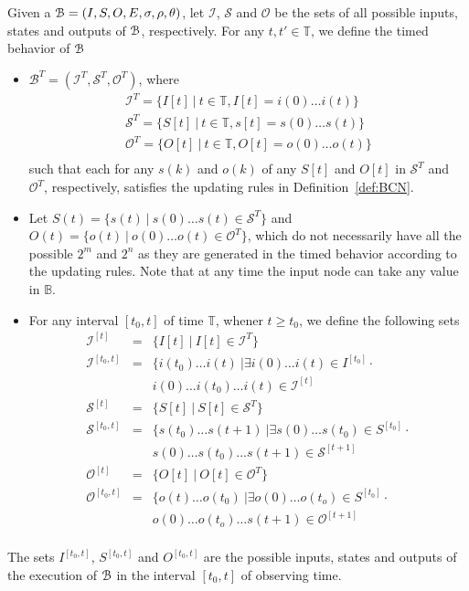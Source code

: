 Given a {\BCN} ${\mathcal{B}} = (I,S,O, E, \sigma, \rho,\theta)$, let $\mathcal{I}$, $\mathcal{S}$ and $\mathcal{O}$ be the sets of all possible inputs, states and outputs of ${\mathcal{B}}$, respectively. For any $t,t' \in \mathbb{T}$, we define the timed behavior of ${\mathcal{B}}$
\begin{itemize}
\item $\mathcal{B}^T = (\mathcal{I}^T, \mathcal{S}^T, \mathcal{O}^T)$,  where 
{\small \[\begin{array}{llll}
\mathcal{I}^T =\{I[t]~|~ t\in \mathbb{T}, I[t]=i(0)\ldots i(t)\}\\
\mathcal{S}^T =\{S[t]~|~ t\in \mathbb{T}, s[t]=s(0)\ldots s(t)\}\\
\mathcal{O}^T =\{O[t]~|~ t\in \mathbb{T}, O[t]=o(0)\ldots o(t)\}\\
\end{array}
\]}
such that each for any $s(k)$ and $o(k)$ of any $S[t]$ and 
$O[t]$ in $\mathcal{S}^T$ and $\mathcal{O}^T$, respectively,   satisfies the updating rules in Definition~\ref{def:BCN}.
\item Let $S(t) = \{ s(t)~|~ s(0)\ldots s(t) \in \mathcal{S}^T\}$ and $O(t) = \{ o(t)~|~ o(0)\ldots o(t) \in \mathcal{O}^T\}$, which do not necessarily have all the possible $2^m$ and $2^n$ as they are generated in the timed behavior according to the updating rules. Note that at any time the input node can take any value in $\mathbb{B}$.
\item For any interval  $[t_0,t]$ of time $\mathbb{T}$, whener $t\geq t_0$, we define the following sets 
\[\begin{array}{llllll}
\mathcal{I}^{[t]} &=& \{I[t] ~|~ I[t]\in \mathcal{I}^T\}\\
\mathcal{I}^{[t_0,t]} &=& \{i(t_0)\ldots i(t)~|\exists i(0)\ldots i(t)\in I^{[t_0]}\cdot\\
&& i(0)\ldots i(t_0) \ldots i(t)\in \mathcal{I}^{[t]} \\
\mathcal{S}^{[t]} &=& \{S[t] ~|~ S[t]\in \mathcal{S}^T\}\\
\mathcal{S}^{[t_0,t]} &=& \{s(t_0)\ldots s(t+1)~|\exists s(0)\ldots s(t_0)\in S^{[t_0]}\cdot\\
&& s(0)\ldots s(t_0) \ldots s(t+1)\in \mathcal{S}^{[t+1]} \\
\mathcal{O}^{[t]} &=& \{O[t] ~|~ O[t]\in \mathcal{O}^T\}\\
\mathcal{O}^{[t_0,t]} &=& \{o(t)\ldots o(t_0)~|\exists o(0)\ldots o(t_o)\in S^{[t_0]}\cdot\\
&& o(0)\ldots o(t_o) \ldots s(t+1)\in \mathcal{O}^{[t+1]} \\
\end{array}
\]
\end{itemize} 
The sets $I^{[t_0,t]}$, $S^{[t_0,t]}$ and $O^{[t_0,t]}$ are the possible inputs, states and outputs of the execution of ${\mathcal{B}}$ in the interval $[t_0,t]$ of observing time. 

